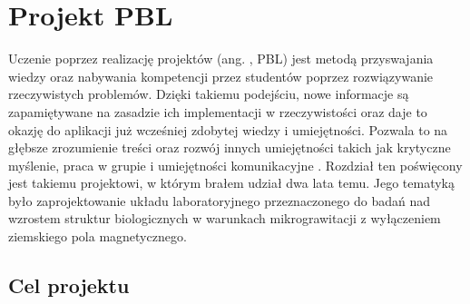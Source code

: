\graphicspath{{./PBL/images}}

\chapter{Projekt PBL}

Uczenie poprzez realizację projektów (ang. , PBL) jest metodą przyswajania wiedzy oraz nabywania kompetencji przez studentów poprzez rozwiązywanie rzeczywistych problemów. Dzięki takiemu podejściu, nowe informacje są zapamiętywane na zasadzie ich implementacji w rzeczywistości oraz daje to okazję do aplikacji już wcześniej zdobytej wiedzy i umiejętności. Pozwala to na głębsze zrozumienie treści oraz rozwój innych umiejętności takich jak krytyczne myślenie, praca w grupie i umiejętności komunikacyjne \cite{bib:PBL}. Rozdział ten poświęcony jest takiemu projektowi, w którym brałem udział dwa lata temu. Jego tematyką było zaprojektowanie układu laboratoryjnego przeznaczonego do badań nad wzrostem struktur biologicznych w warunkach mikrograwitacji z wyłączeniem ziemskiego pola magnetycznego.

\section{Cel projektu} \label{cel_projektu}

